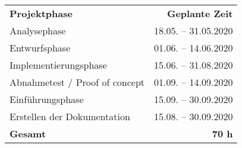 \begin{tabular}{lr}
\rowcolor{heading}\textbf{Projektphase} & \textbf{Geplante Zeit} \\
Analysephase & 18.05. -- 31.05.2020  \\
\rowcolor{odd}Entwurfsphase & 01.06. -- 14.06.2020 \\
Implementierungsphase & 15.06. -- 31.08.2020 \\
\rowcolor{odd}Abnahmetest / Proof of concept & 01.09. -- 14.09.2020\\
Einführungsphase &  15.09. -- 30.09.2020\\
\rowcolor{odd}Erstellen der Dokumentation & 15.08. -- 30.09.2020 \\
\hline
\hline
\rowcolor{odd}\textbf{Gesamt} & \textbf{70 h} \\
\end{tabular}

